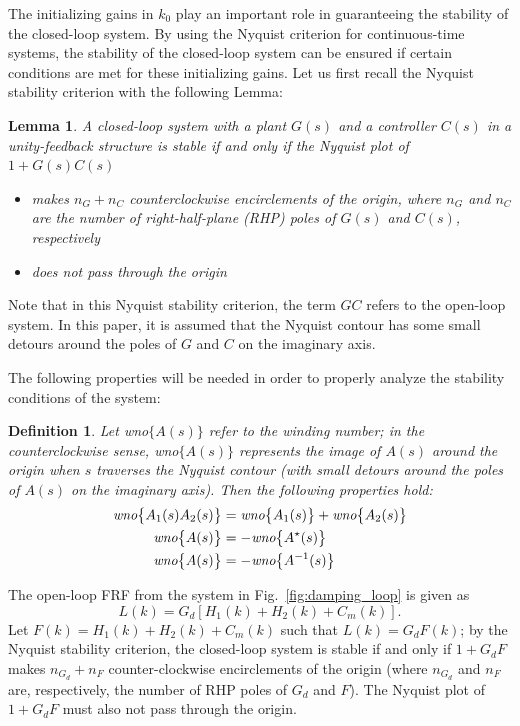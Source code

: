 \documentclass[a4paper, 10pt, conference]{ieeeconf}
\newtheorem{lemma}{Lemma}
\newtheorem{definition}{Definition}
\begin{document}
The initializing gains in $k_0$ play an important role in guaranteeing the stability of the closed-loop system. By using the Nyquist criterion for continuous-time systems, the stability of the closed-loop system can be ensured if certain conditions are met for these initializing gains. Let us first recall the Nyquist stability criterion with the following Lemma:
\begin{lemma}
A closed-loop system with a plant $G(s)$ and a controller $C(s)$ in a unity-feedback structure is stable if and only if the Nyquist plot of $1+G(s)C(s)$
\begin{itemize}
\item makes $n_G + n_C$ counterclockwise encirclements of the origin, where $n_G$ and $n_C$ are the number of right-half-plane (RHP) poles of $G(s)$ and $C(s)$, respectively
\item does not pass through the origin
\end{itemize}
\end{lemma}
Note that in this Nyquist stability criterion, the term $GC$ refers to the open-loop system. In this paper, it is assumed that the Nyquist contour has some small detours around the poles of $G$ and $C$ on the imaginary axis.

The following properties will be needed in order to properly analyze the stability conditions of the system:
\begin{definition}
Let \emph{wno}$\{ A(s)\}$ refer to the winding number; in the counterclockwise sense, \emph{wno}$\{ A(s)\}$ represents the image of $A(s)$ around the origin when $s$ traverses the Nyquist contour (with small detours around the poles of $A(s)$ on the imaginary axis). Then the following properties hold:
\begin{align}
\emph{wno}\bigl\{ A_1(s)A_2(s) \bigr\} &= \emph{wno}\bigl\{ A_1(s) \bigr\} + \emph{wno}\bigl\{ A_2(s) \bigr\}  \label{eq:wno_add}\\ 
\emph{wno}\bigl\{ A(s)\bigr\} &= -\emph{wno}\bigl\{ A^{\star}(s)\bigr\} \label{eq:wno_conj} \\ 
\emph{wno}\bigl\{ A(s)\bigr\} &= -\emph{wno}\bigl\{ A^{-1}(s)\bigr\} \label{eq:wno_inv}
\end{align}
\end{definition}

The open-loop FRF from the system in Fig.~\ref{fig:damping_loop} is given as $$L(k) = G_d[H_1(k)+H_2(k)+C_m(k)].$$ Let $F(k) = H_1(k)+H_2(k)+C_m(k)$ such that $L(k) = G_dF(k)$; by the Nyquist stability criterion, the closed-loop system is stable if and only if $1+G_dF$ makes $n_{G_d}+n_F$ counter-clockwise encirclements of the origin (where $n_{G_d}$ and $n_F$ are, respectively, the number of RHP poles of $G_d$ and $F$). The Nyquist plot of $1+G_dF$ must also not pass through the origin.
\end{document}
